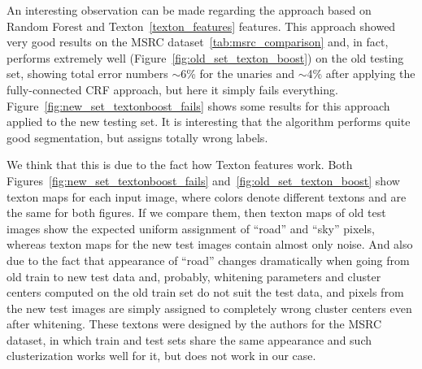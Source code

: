 An interesting observation can be made regarding the approach based on Random Forest and Texton~\ref{texton_features} features. This approach showed
very good results on the MSRC dataset~\ref{tab:msrc_comparison} and, in fact, performs extremely well (Figure~\ref{fig:old_set_texton_boost})
on the old testing set, showing total error numbers $\sim$6\% for the unaries and $\sim$4\% after applying the fully-connected CRF approach, 
but here it simply fails everything. Figure~\ref{fig:new_set_textonboost_fails} shows some results for this approach applied to the new testing set. 
It is interesting that the algorithm performs quite good segmentation, but assigns totally wrong labels. 

We think that this is due to the fact how Texton features work. Both Figures~\ref{fig:new_set_textonboost_fails} and~\ref{fig:old_set_texton_boost} 
show texton maps for each input image, where colors denote different textons and are the same for both figures. 
If we compare them, then texton maps of old test images show the expected uniform assignment of ``road'' and ``sky'' pixels, whereas texton maps for the 
new test images contain almost only noise. And also due to the fact that appearance of ``road'' changes dramatically when going from old train to new 
test data and, probably, whitening parameters and cluster centers computed on the old train set do not suit the test data, 
and pixels from the new test images are simply assigned to completely wrong cluster centers even after whitening. 
These textons were designed by the authors for the MSRC dataset, in which train and test sets
share the same appearance and such clusterization works well for it, but does not work in our case.

